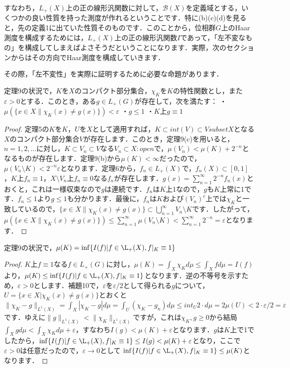 すなわち，$L_{+}(X)$上の正の線形汎関数に対して，$\mathscr{B}(X)$を定義域とする，いくつかの良い性質を持った測度が作れるということです．特に(b)(c)(d)を見ると，先の定義1に出ていた性質そのものです．このことから，位相群$G$上のHaar測度を構成するためには，$L_{+}(X)$上の正の線形汎関数$I$であって，「左不変なもの」を構成してしまえばよさそうだということになります．実際，次のセクションからはその方向でHaar測度を構成していきます．

その際，「左不変性」を実際に証明するために必要な命題があります．

\begin{lem}
定理9の状況で，$K$を$X$のコンパクト部分集合，$\chi_{K}$を$K$の特性関数とし，また$\varepsilon >0$とする．このとき，ある$g \in L_{+}(G)$が存在して，次を満たす：
・$\mu ( \{ x \in X \| \chi_{K}(x) \neq g(x) \} ) < \varepsilon $
・$g \le 1$
・$K$上$g \equiv 1$
\end{lem}
\begin{proof}
定理5の$K$を$K$，$U$を$X$として適用すれば，$K \subset int(V) \subset V subset X$となる$X$のコンパクト部分集合$V$が存在します．このとき，定理9(c)を用いると，$n=1,2,\ldots$に対し，$K \subset V_n \subset V$なる$V_n \subset X \colon open$で，$\mu(V_n) < \mu(K) + 2^{-n}$となるものが存在します．定理9(b)から$\mu(K)<\infty$だったので，$\mu(V_n \setminus K) < 2^{-n}\varepsilon$となります．定理6から，$f_n \in L_{+}(X)$で，$f_n(X) \subset [0,1]$，$K$上$f_n \equiv 1$，$X \setminus V_n$上$f_n \equiv 0$なる$f_n$が存在します．$g(x)=\sum_{n=1}^{\infty}2^{-n}f_n(x)$とおくと，これは一様収束なので$g$は連続です．$f_n$は$K$上1なので，$g$も$K$上常に1です．$f_n \le 1$より$g \le 1$も分かります．最後に，$f_n$は$K$および$(V_n)^{c}$上では$\chi_{K}$と一致しているので，$\{ x \in X \| \chi_{K}(x) \neq g(x) \} \subset \bigcup_{n=1}^{\infty}V_n \setminus K$です．したがって，$\mu( \{ x \in X \| \chi_{K}(x) \neq g(x) \} ) \le \sum_{n=1}^{\infty} \mu(V_n \setminus K) < \sum_{n=1}^{\infty}2^{-n}=\varepsilon$となります．
\end{proof}
\begin{prop}
定理9の状況で，$\mu(K)= \inf \{ I(f) | f \in \L_{+}(X), f|_{K} \equiv 1 \}$
\end{prop}
\begin{proof}
$K$上$f \equiv 1$なる$f \in L_{+}(G)$に対し，$ \mu(K)=\int_{X}\chi_K d\mu \le \int_{X}f d\mu=I(f)$より，$\mu(K) \le \inf \{ I(f) | f \in \L_{+}(X), f|_{K} \equiv 1 \}$となります．逆の不等号を示すため，$\varepsilon>0$とします．補題10で，$\varepsilon$を$\varepsilon /2$として得られる$g$について，$U=\{ x \in X | \chi_{K}(x) \neq g(x) \}$とおくと$\| \chi_{K}-g\| _{L^1(X)} = \int_{X}|\chi_K-g|d\mu = \int_{U}(\chi_K-g_n)d\mu \le int_{U}2 \cdot d\mu=2\mu(U)<2 \cdot \varepsilon / 2=\varepsilon$です．ゆえに$\| g\| _{L^1(X)} < \| \chi_{K} \| _{L^1(X)} $ですが，これは$\chi_K, g \ge 0$から結局 $\int_{X}gd\mu < \int_{X}\chi_{K}d\mu +\varepsilon$，すなわち$I(g)<\mu (K)+\varepsilon$となります．$g$は$K$上で1でしたから，$\inf \{ I(f) | f \in \L_{+}(X), f|_{K} \equiv 1 \} \le I(g) <\mu (K)+\varepsilon$となり，ここで$\varepsilon>0$は任意だったので，$\varepsilon \to 0$として $\inf \{ I(f) | f \in \L_{+}(X), f|_{K} \equiv 1 \} \le \mu (K)$となります．
\end{proof}

